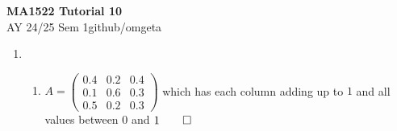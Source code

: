 \documentclass[12pt, a4paper]{article}
\newcommand{\mytitle}{MA1522 Tutorial 10}
\newcommand{\myauthor}{github/omgeta}
\newcommand{\mydate}{AY 24/25 Sem 1}
\begin{document}
\raggedright
\footnotesize
\begin{center}
{\normalsize{\textbf{\mytitle}}} \\
{\footnotesize{\mydate\hspace{2pt}\textemdash\hspace{2pt}\myauthor}}
\end{center}

\begin{enumerate}[Q\arabic*.]
  \item 
    \begin{enumerate}[(\alph*)]
      \item $A = \left(\begin{array}{ccc} 0.4 & 0.2 & 0.4\\ 0.1 & 0.6 & 0.3\\ 0.5 & 0.2 & 0.3 \end{array}\right)$ which has each column adding up to $1$ and all values between $0$ and $1 \qed$


\end{enumerate}
\end{enumerate}
\end{document}
